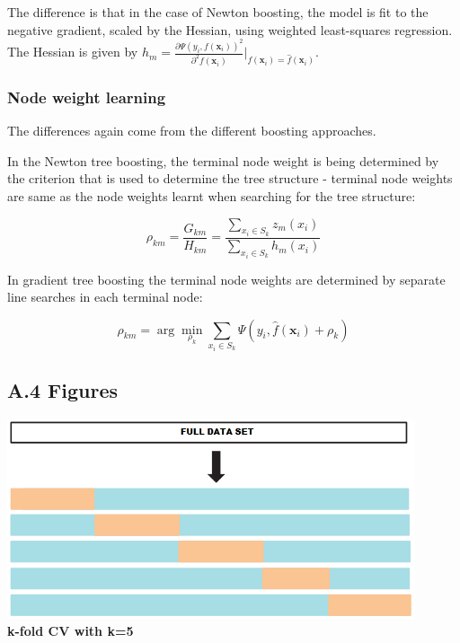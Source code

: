 \documentclass[12pt,]{article}
\begin{document}
The difference is that in the case of Newton boosting, the model is fit
to the negative gradient, scaled by the Hessian, using weighted
least-squares regression. The Hessian is given by
\(h_m = \frac{\partial{\Psi(y_{i},f(\mathbf{x}_i))}^{2}}{\partial^{2}{f(\mathbf{x}_i)}}\rvert_{f(\mathbf{x}_i)=\widehat{f}(\mathbf{x}_i)}\).

\hypertarget{node-weight-learning}{%
\subsubsection{Node weight learning}\label{node-weight-learning}}

The differences again come from the different boosting approaches.

In the Newton tree boosting, the terminal node weight is being
determined by the criterion that is used to determine the tree structure
- terminal node weights are same as the node weights learnt when
searching for the tree structure:

\[\rho_{km}=\frac{G_{km}}{H_{km}}=\frac{\sum_{x_i\in S_k}z_m(x_i)}{\sum_{x_i\in S_k}h_m(x_i)}\]

In gradient tree boosting the terminal node weights are determined by
separate line searches in each terminal node:

\[\rho_{km} = \arg\min_{\rho_k}\sum_{x_i\in S_k}\Psi(y_i,\widehat{f}(\mathbf{x}_{i})+\rho_k)\]

\clearpage

\hypertarget{a.4-figures}{%
\subsection{A.4 Figures}\label{a.4-figures}}

\includegraphics[width=0.9\textwidth,height=\textheight]{figures/crossval.png}\\
\textbf{k-fold CV with k=5}

\clearpage
\end{document}

